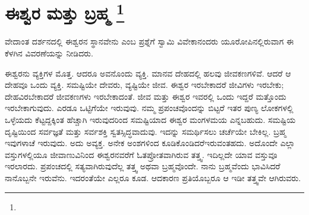 
\chapter[ಈಶ್ವರ ಮತ್ತು ಬ್ರಹ್ಮ ]{ಈಶ್ವರ ಮತ್ತು ಬ್ರಹ್ಮ \protect\footnote{}}

ವೇದಾಂತ ದರ್ಶನದಲ್ಲಿ ಈಶ್ವರನ ಸ್ಥಾನವೇನು ಎಂಬ ಪ್ರಶ್ನೆಗೆ ಸ್ವಾಮಿ ವಿವೇಕಾನಂದರು ಯೂರೋಪಿನಲ್ಲಿರುವಾಗ ಈ ಕೆಳಗಿನ ವಿವರಣೆಯನ್ನು ನೀಡಿದರು.

ಈಶ್ವರನು ವ್ಯಕ್ತಿಗಳ ಮೊತ್ತ. ಆದರೂ ಅವನೊಂದು ವ್ಯಕ್ತಿ. ಮಾನವ ದೇಹದಲ್ಲಿ ಹಲವು ಜೀವಕಣಗಳಿವೆ. ಆದರೆ ಆ ದೇಹವೂ ಒಂದು ವ್ಯಕ್ತಿ. ಸಮಷ್ಟಿಯೇ ದೇವರು, ವ್ಯಷ್ಟಿಯೇ ಜೀವ. ಈಶ್ವರ ಇರಬೇಕಾದರೆ ಜೀವಿಗಳು ಇರಬೇಕು; ದೇಹವಿರಬೇಕಾದರೆ ಜೀವಕಣಗಳು  ಇರಬೇಕಾದಂತೆ. ಜೀವ ಮತ್ತು ಈಶ್ವರ ಇವರಲ್ಲಿ ಒಂದು ಇದ್ದರೆ ಮತ್ತೊಂದು ಇರಬೇಕಾಗುವುದು. ಎರಡೂ ಒಟ್ಟಿಗೆಯೇ ಇರುವುವು. ನಮ್ಮ ಪ್ರಪಂಚವೊಂದನ್ನು ಬಿಟ್ಟರೆ ಇತರ ಪುಣ್ಯ ಲೋಕಗಳಲ್ಲಿ ಒಳ್ಳೆಯದು ಕೆಟ್ಟದ್ದಕ್ಕಿಂತ ಹೆಚ್ಚಾಗಿ ಇರುವುದರಿಂದ ಸಮಷ್ಟಿಯಾದ ಈಶ್ವರ ಮಂಗಳಮಯ ಎನ್ನಬಹುದು. ಸಮಷ್ಟಿಯ ದೃಷ್ಟಿಯಿಂದ ಸರ್ವಜ್ಞತೆ ಮತ್ತು ಸರ್ವಶಕ್ತಿ ಸ್ವತಸ್ಸಿದ್ಧವಾದುವು. ಇದನ್ನು ಸಮರ್ಥಿಸಲು ಚರ್ಚೆಯೇ ಬೇಕಿಲ್ಲ. ಬ್ರಹ್ಮ ಇವುಗಳಾಚೆ ಇರುವುದು. ಅದು ಅವ್ಯಕ್ತ. ಅನೇಕ ಅಂಶಗಳಿಂದ ಕೂಡಿಕೊಂಡಿದರೆ\break ಇರುವಂತಹದು. ಅದೊಂದೇ ಎಲ್ಲಾ ವಸ್ತುಗಳಲ್ಲಿಯೂ ಜೀವಾಣುವಿನಿಂದ ಈಶ್ವರನವರೆಗೆ ಓತಪ್ರೋತವಾಗಿರುವ ತತ್ತ್ವ. ಇದಿಲ್ಲದೇ ಯಾವ ವಸ್ತುವೂ ಇರಲಾರದು. ಪ್ರಪಂಚದಲ್ಲಿ ಸತ್ಯವಾಗಿರುವುದೆಲ್ಲ ತತ್ತ್ವ ಅಥವಾ ಬ್ರಹ್ಮವೊಂದೇ. ನಾನು ಬ್ರಹ್ಮವೆಂದು ಭಾವಿಸಿದರೆ ನಾನೊಬ್ಬನೇ ಇರುವೆನು. ಇದರಂತೆಯೇ ಎಲ್ಲರೂ ಕೂಡ. ಆದಕಾರಣ ಪ್ರತಿಯೊಬ್ಬರೂ ಆ ಇಡೀ ತತ್ತ್ವವೇ ಆಗಿರುವರು.


